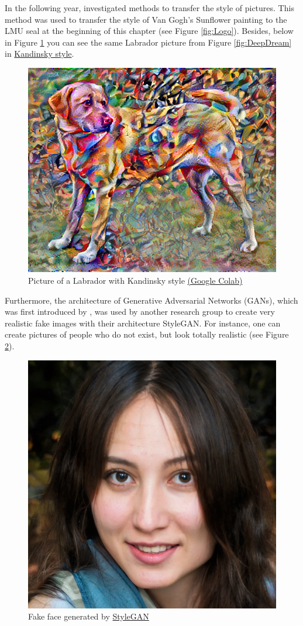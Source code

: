 \documentclass[
]{krantz}
\begin{document}
In the following year, \citet{StyleTransfer} investigated methods to transfer the style of pictures. This method was used to transfer the style of Van Gogh's Sunflower painting to the LMU seal at the beginning of this chapter (see Figure \ref{fig:Logo}). Besides, below in Figure \ref{fig:StyleTransfer2} you can see the same Labrador picture from Figure \ref{fig:DeepDream} in \href{https://storage.googleapis.com/download.tensorflow.org/example_images/Vassily_Kandinsky\%2C_1913_-_Composition_7.jpg}{Kandinsky style}.

\begin{figure}

{\centering \includegraphics[width=0.5\linewidth]{./figures/03-chapter3/Kandinsky} 

}

\caption{Picture of a Labrador with Kandinsky style \href{https://www.tensorflow.org/tutorials/generative/style_transfer}{(Google Colab)}}\label{fig:StyleTransfer2}
\end{figure}



Furthermore, the architecture of Generative Adversarial Networks (GANs), which was first introduced by \citet{NIPS2014_5ca3e9b1}, was used by another research group \citet{karras2019style} to create very realistic fake images with their architecture StyleGAN. For instance, one can create pictures of people who do not exist, but look totally realistic (see Figure \ref{fig:GAN}).

\begin{figure}

{\centering \includegraphics[width=0.5\linewidth]{./figures/03-chapter3/StyleGAN} 

}

\caption{Fake face generated by \href{https://thispersondoesnotexist.com/}{StyleGAN}}\label{fig:GAN}
\end{figure}
\end{document}
